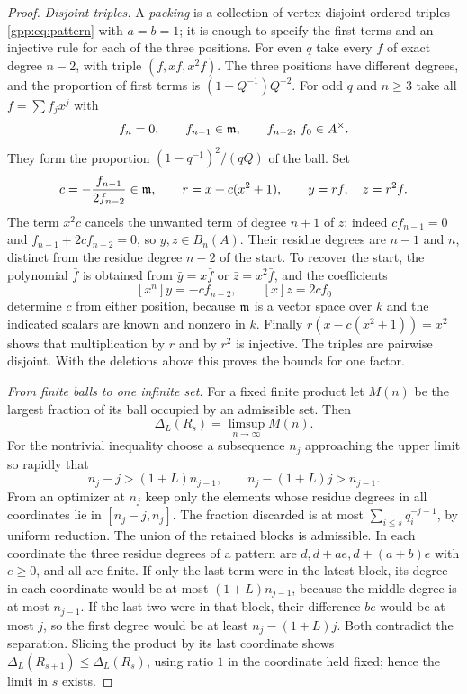 \begin{proof}
\emph{Disjoint triples.} A \emph{packing} is a collection of vertex-disjoint ordered
triples \eqref{gpp:eq:pattern} with $a=b=1$; it is enough to specify the first terms and
an injective rule for each of the three positions. For even $q$ take every $f$ of exact
degree $n-2$, with triple $(f,xf,x^2f)$. The three positions have different degrees, and
the proportion of first terms is $(1-Q^{-1})Q^{-2}$. For odd $q$ and $n\ge3$ take all
$f=\sum f_jx^j$ with
\[
 f_n=0,\qquad f_{n-1}\in\mathfrak{m},\qquad f_{n-2},\,f_0\in A^\times .
\]
They form the proportion $(1-q^{-1})^2/(qQ)$ of the ball. Set
\[
 c=-\frac{f_{n-1}}{2f_{n-2}}\in\mathfrak{m},\qquad r=x+c(x^2+1),\qquad y=rf,\quad z=r^2f .
\]
The term $x^2c$ cancels the unwanted term of degree $n+1$ of $z$: indeed $cf_{n-1}=0$
and $f_{n-1}+2cf_{n-2}=0$, so $y,z\in B_n(A)$. Their residue degrees are $n-1$ and $n$,
distinct from the residue degree $n-2$ of the start. To recover the start, the
polynomial $\bar f$ is obtained from $\bar y=x\bar f$ or $\bar z=x^2\bar f$, and the
coefficients
\[
 [x^n]y=-cf_{n-2},\qquad[x]z=2cf_0
\]
determine $c$ from either position, because $\mathfrak{m}$ is a vector space over $k$ and the
indicated scalars are known and nonzero in $k$. Finally $r(x-c(x^2+1))=x^2$ shows that
multiplication by $r$ and by $r^2$ is injective. The triples are pairwise disjoint. With
the deletions above this proves the bounds for one factor.

\emph{From finite balls to one infinite set.} For a fixed finite product let $M(n)$ be the
largest fraction of its ball occupied by an admissible set. Then
\begin{equation}\label{gpp:eq:glueproduct}
 \Delta_L(R_s)=\limsup_{n\to\infty}M(n).
\end{equation}
For the nontrivial inequality choose a subsequence $n_j$ approaching the upper limit so
rapidly that
\[
 n_j-j>(1+L)n_{j-1},\qquad n_j-(1+L)j>n_{j-1}.
\]
From an optimizer at $n_j$ keep only the elements whose residue degrees in all
coordinates lie in $[n_j-j,n_j]$. The fraction discarded is at most
$\sum_{i\le s}q_i^{-j-1}$, by uniform reduction. The union of the retained blocks is
admissible. In each coordinate the three residue degrees of a pattern are
$d,d+ae,d+(a+b)e$ with $e\ge0$, and all are finite. If only the last term were in the
latest block, its degree in each coordinate would be at most $(1+L)n_{j-1}$, because the
middle degree is at most $n_{j-1}$. If the last two were in that block, their difference
$be$ would be at most $j$, so the first degree would be at least $n_j-(1+L)j$. Both
contradict the separation. Slicing the product by its last coordinate shows
$\Delta_L(R_{s+1})\le\Delta_L(R_s)$, using ratio $1$ in the coordinate held fixed; hence
the limit in $s$ exists.


\end{proof}
